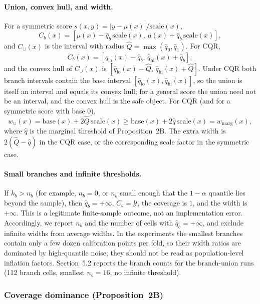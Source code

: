 \paragraph{Union, convex hull, and width.}
For a symmetric score
$s(x,y)=|y-\mu(x)|/\mathrm{scale}(x)$,
\[
C_b(x)=[\mu(x)-\hat q_b\,\mathrm{scale}(x),\,
\mu(x)+\hat q_b\,\mathrm{scale}(x)],
\]
and $C_\cup(x)$ is the interval with radius
$\hat Q=\max(\hat q_0,\hat q_1)$.  For CQR,
\[
C_b(x)=[\hat q_{\mathrm{lo}}(x)-\hat q_b,\,
\hat q_{\mathrm{hi}}(x)+\hat q_b],
\]
and the convex hull of $C_\cup(x)$ is
$[\hat q_{\mathrm{lo}}(x)-\hat Q,\,
\hat q_{\mathrm{hi}}(x)+\hat Q]$.  Under CQR both branch intervals
contain the base interval
$[\hat q_{\mathrm{lo}}(x),\hat q_{\mathrm{hi}}(x)]$, so the union is
itself an interval and equals its convex hull; for a general score the
union need not be an interval, and the convex hull is the safe object.
For CQR (and for a symmetric score with base $0$),
\[
w_\cup(x)=\mathrm{base}(x)+2\hat Q\,\mathrm{scale}(x)
\ge\mathrm{base}(x)+2\hat q\,\mathrm{scale}(x)=w_{\mathrm{marg}}(x),
\]
where $\hat q$ is the marginal threshold of Proposition~2B.  The extra
width is $2(\hat Q-\hat q)$ in the CQR case, or the corresponding
scale factor in the symmetric case.

\paragraph{Small branches and infinite thresholds.}
If $k_b>n_b$ (for example, $n_b=0$, or $n_b$ small enough that the
$1-\alpha$ quantile lies beyond the sample), then
$\hat q_b=+\infty$, $C_b=\mathcal Y$, the coverage is $1$, and the width
is $+\infty$.  This is a legitimate finite-sample outcome, not an
implementation error.  Accordingly, we report $n_b$ and the number of
cells with $\hat q_b=+\infty$, and exclude infinite widths from average
widths.  In the experiments the smallest branches contain
only a few dozen calibration points per fold, so their width ratios are
dominated by high-quantile noise; they should not be read as
population-level inflation factors.  Section~5.2 reports the branch counts
for the branch-union runs (112 branch cells, smallest $n_b=16$, no
infinite threshold).

\subsubsection{Coverage dominance (Proposition~2B)}

